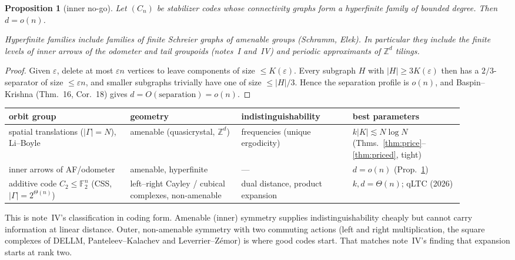 \documentclass[11pt]{article}
\newtheorem{proposition}[theorem]{Proposition}
\theoremstyle{definition}
\theoremstyle{remark}
\newcommand{\Z}{\mathbb Z}
\newcommand{\F}{\mathbb F}
\begin{document}
\begin{proposition}[inner no-go]\label{prop:nogo}
Let $(C_n)$ be stabilizer codes whose connectivity graphs form a hyperfinite family of bounded degree. Then $d=o(n)$.

Hyperfinite families include families of finite Schreier graphs of amenable groups (Schramm, Elek). In particular they include the finite levels of inner arrows of the odometer and tail groupoids (notes~I and~IV) and periodic approximants of $\Z^d$ tilings.
\end{proposition}

\begin{proof}
Given $\varepsilon$, delete at most $\varepsilon n$ vertices to leave components of size $\le K(\varepsilon)$. Every subgraph $H$ with $|H|\ge3K(\varepsilon)$ then has a $2/3$-separator of size $\le\varepsilon n$, and smaller subgraphs trivially have one of size $\le|H|/3$. Hence the separation profile is $o(n)$, and Baspin--Krishna (Thm.~16, Cor.~18) gives $d=O(\text{separation})=o(n)$.
\end{proof}

\begin{center}\small
\begin{tabular}{p{0.24\linewidth}p{0.22\linewidth}p{0.22\linewidth}p{0.22\linewidth}}
\toprule
orbit group & geometry & indistinguishability & best parameters\\
\midrule
spatial translations ($|\Gamma|=N$), Li--Boyle & amenable (quasicrystal, $\Z^d$) & frequencies (unique ergodicity) & $k|K|\lesssim N\log N$ (Thms.~\ref{thm:price}--\ref{thm:priced}, tight)\\
inner arrows of AF/odometer & amenable, hyperfinite & --- & $d=o(n)$ (Prop.~\ref{prop:nogo})\\
additive code $C_2\le\F_2^n$ (CSS, $|\Gamma|=2^{\Theta(n)}$) & left--right Cayley / cubical complexes, non-amenable & dual distance, product expansion & $k,d=\Theta(n)$; qLTC (2026)\\
\bottomrule
\end{tabular}
\end{center}

This is note~IV's classification in coding form. Amenable (inner) symmetry supplies indistinguishability cheaply but cannot carry information at linear distance. Outer, non-amenable symmetry with two commuting actions (left and right multiplication, the square complexes of DELLM, Panteleev--Kalachev and Leverrier--Z\'emor) is where good codes start. That matches note~IV's finding that expansion starts at rank two.
\end{document}
